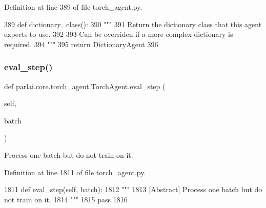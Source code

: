 Definition at line 389 of file torch\+\_\+agent.\+py.


\begin{DoxyCode}
389     \textcolor{keyword}{def }dictionary\_class():
390         \textcolor{stringliteral}{"""}
391 \textcolor{stringliteral}{        Return the dictionary class that this agent expects to use.}
392 \textcolor{stringliteral}{}
393 \textcolor{stringliteral}{        Can be overriden if a more complex dictionary is required.}
394 \textcolor{stringliteral}{        """}
395         \textcolor{keywordflow}{return} DictionaryAgent
396 
\end{DoxyCode}
\mbox{\label{classparlai_1_1core_1_1torch__agent_1_1TorchAgent_a18de0a52aeec4ef721aedbdd6ac06cad}} 
\subsubsection{\texorpdfstring{eval\+\_\+step()}{eval\_step()}}
{\footnotesize\ttfamily def parlai.\+core.\+torch\+\_\+agent.\+Torch\+Agent.\+eval\+\_\+step (\begin{DoxyParamCaption}\item[{}]{self,  }\item[{}]{batch }\end{DoxyParamCaption})}

\begin{DoxyVerb}[Abstract] Process one batch but do not train on it.
\end{DoxyVerb}
 

Definition at line 1811 of file torch\+\_\+agent.\+py.


\begin{DoxyCode}
1811     \textcolor{keyword}{def }eval\_step(self, batch):
1812         \textcolor{stringliteral}{"""}
1813 \textcolor{stringliteral}{        [Abstract] Process one batch but do not train on it.}
1814 \textcolor{stringliteral}{        """}
1815         \textcolor{keywordflow}{pass}
1816 
\end{DoxyCode}
\mbox{\label{classparlai_1_1core_1_1torch__agent_1_1TorchAgent_a0bd9118252c602bb9d5a596ecae16717}} 
